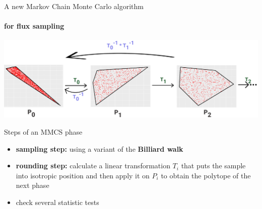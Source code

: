 \documentclass{beamer}
\begin{document}

   \begin{frame}{A new Markov Chain Monte Carlo algorithm}
      \framesubtitle{for flux sampling}

      \includegraphics[scale=0.11]{ ../met_nets/resources/sampling_extra_phase_croped_transparent.png}
      
      \scriptsize
      \begin{block}{Steps of an MMCS phase}
         \begin{itemize}
            \item \textbf{sampling step:} using a variant of the \textbf{Billiard walk}  
            \item \textbf{rounding step:} calculate a linear transformation $T_i$ that puts the sample into isotropic position and then apply it on $P_i$ to obtain the polytope of the next phase
            \item check several statistic tests
         \end{itemize}      

      \end{block}

   

   \end{frame}
\end{document}
